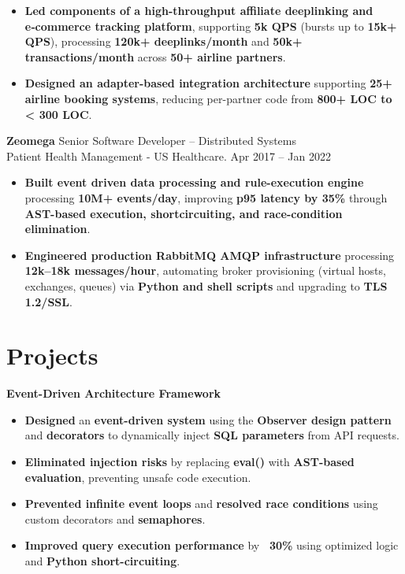 \documentclass[11 pt]{article}
\begin{document}
\begin{itemize}
\item \textbf{Led components of a high-throughput affiliate deeplinking and e‑commerce tracking platform}, supporting \textbf{5k QPS} (bursts up to \textbf{15k+ QPS}), processing \textbf{120k+ deeplinks/month} and \textbf{50k+ transactions/month} across \textbf{50+ airline partners}.

\item \textbf{Designed an adapter-based integration architecture} supporting \textbf{25+ airline booking systems}, reducing per-partner code from \textbf{800+ LOC to < 300 LOC}.
\end{itemize}

\vspace{6pt}

\noindent
{\normalsize\textbf{Zeomega}} \hfill \small{Senior Software Developer – Distributed Systems} \\
{Patient Health Management - US Healthcare. \hfill Apr 2017 -- Jan 2022}

\begin{itemize}
\item \textbf{Built event driven data processing and rule-execution engine} processing \textbf{10M+ events/day}, improving \textbf{p95 latency by 35\%} through \textbf{AST-based execution, shortcircuiting, and race-condition elimination}.

\item \textbf{Engineered production RabbitMQ AMQP infrastructure} processing \textbf{12k--18k messages/hour}, automating broker provisioning (virtual hosts, exchanges, queues) via \textbf{Python and shell scripts} and upgrading to \textbf{TLS 1.2/SSL}.
\end{itemize}




\section*{\textbf{Projects}}

\noindent\textbf{Event-Driven Architecture Framework}
\begin{itemize}
  \item \textbf{Designed} an \textbf{event-driven system} using the \textbf{Observer design pattern} and \textbf{decorators} to dynamically inject \textbf{SQL parameters} from API requests.
  \item \textbf{Eliminated injection risks} by replacing \textbf{eval()} with \textbf{AST-based evaluation}, preventing unsafe code execution.
  \item \textbf{Prevented infinite event loops} and \textbf{resolved race conditions} using custom decorators and \textbf{semaphores}.
  \item \textbf{Improved query execution performance} by \textbf{~30\%} using optimized logic and \textbf{Python short-circuiting}.
\end{itemize}
\vspace{6pt}
\end{document}
